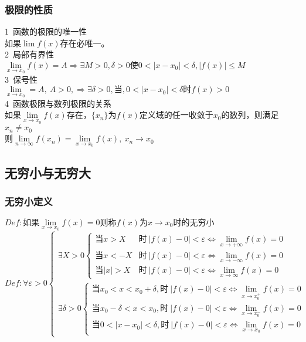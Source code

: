 \subsubsection{极限的性质}
1\ 函数的极限的唯一性\\
如果$\lim f(x)$存在必唯一。\\
2\ 局部有界性\\
$\lim\limits_{x\to x_0}f(x)=A\Rightarrow\exists M>0,\delta >0\mbox{使}0<\left|x-x_0\right|<\delta,\left|f(x)\right|\leqslant M$\\
3\ 保号性\\
$\lim\limits_{x\to x_0}=A,\ A>0,\Rightarrow \exists \delta >0,\mbox{当},0<\left|x-x_0\right|<\delta\mbox{时}f(x)>0$
\\4\ 函数极限与数列极限的关系\\
如果$\lim\limits_{x\to x_0}f(x)$存在，$\{x_n\}$为$f(x)$定义域的任一收敛于$x_0$的数列，则满足$x_n\neq x_0$\\
则$\lim\limits_{n\to \infty}f(x_n)=\lim\limits_{x\to x_0}f(x),\ x_n\rightarrow x_0$

\subsection{无穷小与无穷大}
\subsubsection{无穷小定义}
$Def:\mbox{如果}\lim\limits_{x\to x_0}f(x)= 0\mbox{则称}f(x)\mbox{为}x\rightarrow x_0\mbox{时的无穷小}$\\
$Def: \forall \varepsilon >0\begin{cases}\exists X>0\begin{cases}
        \mbox{当}x>X&\mbox{时}\ \left|f(x)-0\right|<\varepsilon \Leftrightarrow \lim\limits_{x\to +\infty}f(x)=0\\
        \mbox{当}x<-X&\mbox{时}\ \left|f(x)-0\right|<\varepsilon \Leftrightarrow \lim\limits_{x\to -\infty}f(x)=0\\
        \mbox{当}\left|x\right|>X&\mbox{时}\ \left|f(x)-0\right|<\varepsilon \Leftrightarrow \lim\limits_{x\to \infty}f(x)=0
    \end{cases}\\
    \exists\delta>0\begin{cases}
        \mbox{当}x_0<x<x_0+\delta,\mbox{时}\ \left|f(x)-0\right|<\varepsilon\Leftrightarrow\lim\limits_{x\to x_0^+}f(x)=0\\
        \mbox{当}x_0-\delta<x<x_0 ,\mbox{时}\ \left|f(x)-0\right|<\varepsilon\Leftrightarrow\lim\limits_{x\to x_0^-}f(x)=0\\
        \mbox{当}0<\left|x-x_0\right|<\delta,\mbox{时}\ \left|f(x)-0\right|<\varepsilon\Leftrightarrow\lim\limits_{x\to x_0}f(x)=0
    \end{cases}
\end{cases}$
